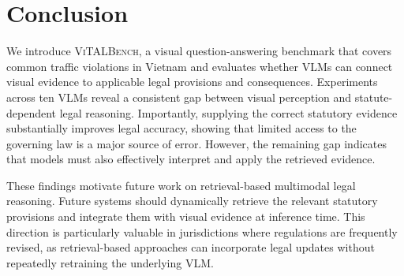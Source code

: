 \section{Conclusion}

We introduce \textsc{ViTALBench}, a visual question-answering benchmark that covers common traffic violations in Vietnam and evaluates whether VLMs can connect visual evidence to applicable legal provisions and consequences. Experiments across ten VLMs reveal a consistent gap between visual perception and statute-dependent legal reasoning. Importantly, supplying the correct statutory evidence substantially improves legal accuracy, showing that limited access to the governing law is a major source of error. However, the remaining gap indicates that models must also effectively interpret and apply the retrieved evidence.

These findings motivate future work on retrieval-based multimodal legal reasoning. Future systems should dynamically retrieve the relevant statutory provisions and integrate them with visual evidence at inference time. This direction is particularly valuable in jurisdictions where regulations are frequently revised, as retrieval-based approaches can incorporate legal updates without repeatedly retraining the underlying VLM.







